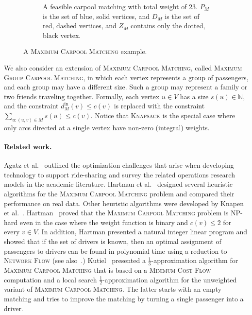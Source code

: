 \documentclass[11pt]{article}
\newcommand{\half}{\frac{1}{2}}
\def\N{\mathbb{N}}
\newcommand{\din}[1][M]{d^{\text{in}}_{#1}}
\newcommand{\carpool}{\textsc{Maximum Carpool Matching}\xspace}
\newcommand{\gcp}{\textsc{Maximum Group Carpool Matching}\xspace}
\begin{document}
\begin{figure}[t]
\begin{subfigure}[t]{.45\linewidth}
\caption{A feasible carpool matching with total weight of 23.  $P_M$
  is the set of blue, solid vertices, and $D_M$ is the set of red,
  dashed vertices, and $Z_M$ contains only the dotted, black vertex.}
\end{subfigure}
\caption[]{
\label{fig:carpool}
A \carpool example.
}
\end{figure}  

%
We also consider an extension of \carpool, called \gcp, in which each
vertex represents a group of passengers, and each group may have a
different size.  Such a group may represent a family or two friends
traveling together.  Formally, each vertex $u \in V$ has a size
$s(u) \in \N$, and the constraint $\din[M](v) \leq c(v)$ is replaced
with the constraint $\sum_{u:(u,v) \in M} s(u) \leq c(v)$.
%
Notice that \textsc{Knapsack} is the special case where only arcs
directed at a single vertex have non-zero (integral) weights.


\paragraph*{Related work.}
%
Agatz et al.~\cite{agatz2012optimization} outlined the optimization
challenges that arise when developing technology to support
ride-sharing and survey the related operations research models in the
academic literature.
%
Hartman et al.~\cite{hartman2014theory} designed several heuristic
algorithms for the \carpool problem and compared their performance on
real data.  Other heuristic algorithms were developed by Knapen et
al.~\cite{knapen2014exploiting}.
%
Hartman~\cite{hartman2013optimal} proved that the \carpool problem is
NP-hard even in the case where the weight function is binary and
$c(v) \leq 2$ for every $v \in V$.  In addition, Hartman presented a
natural integer linear program and showed that if the set of drivers
is known, then an optimal assignment of passengers to drivers can be
found in polynomial time using a reduction to \textsc{Network Flow}
(see also~\cite{kutiel2017}.)
%
Kutiel~\cite{kutiel2017} presented a $\frac{1}{3}$-approximation
algorithm for \carpool that is based on a \textsc{Minimum Cost Flow}
computation and a local search $\half$-approximation algorithm for the
unweighted variant of \carpool.  The latter starts with an empty
matching and tries to improve the matching by turning a single
passenger into a driver.
\end{document}
